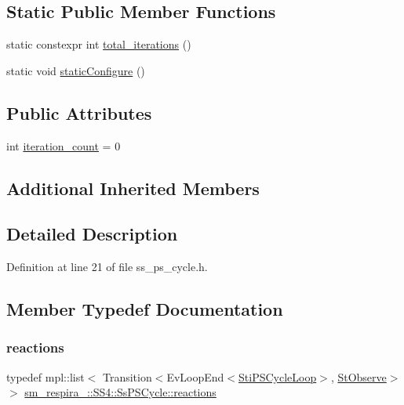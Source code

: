 \subsection*{Static Public Member Functions}
\begin{DoxyCompactItemize}
\item 
static constexpr int \hyperlink{structsm__respira__1_1_1SS4_1_1SsPSCycle_a812d9e6bd288fe71ad44d30b4e63bc87}{total\+\_\+iterations} ()
\item 
static void \hyperlink{structsm__respira__1_1_1SS4_1_1SsPSCycle_a1d9cf15cc9fc3453cc3bafed4b18d313}{static\+Configure} ()
\end{DoxyCompactItemize}
\subsection*{Public Attributes}
\begin{DoxyCompactItemize}
\item 
int \hyperlink{structsm__respira__1_1_1SS4_1_1SsPSCycle_aeb5bdbd23c6c8b5614d7f3cca52216bd}{iteration\+\_\+count} = 0
\end{DoxyCompactItemize}
\subsection*{Additional Inherited Members}


\subsection{Detailed Description}


Definition at line 21 of file ss\+\_\+ps\+\_\+cycle.\+h.



\subsection{Member Typedef Documentation}
\mbox{\label{structsm__respira__1_1_1SS4_1_1SsPSCycle_aad6397ffff7eef88efc3824b91423462}} 
\subsubsection{\texorpdfstring{reactions}{reactions}}
{\footnotesize\ttfamily typedef mpl\+::list$<$ Transition$<$Ev\+Loop\+End$<$\hyperlink{structsm__respira__1_1_1ps__cycle__inner__states_1_1StiPSCycleLoop}{Sti\+P\+S\+Cycle\+Loop}$>$, \hyperlink{structsm__respira__1_1_1StObserve}{St\+Observe}$>$ $>$ \hyperlink{structsm__respira__1_1_1SS4_1_1SsPSCycle_aad6397ffff7eef88efc3824b91423462}{sm\+\_\+respira\+\_\+::\+S\+S4\+::\+Ss\+P\+S\+Cycle\+::reactions}}



